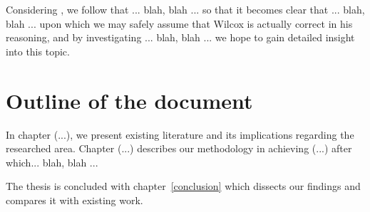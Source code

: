 Considering \cite{wilcox}, we follow that ... blah, blah ... so that it becomes
clear that ... blah, blah ... upon which we may safely assume that Wilcox is
actually correct in his reasoning, and by investigating ... blah, blah ...
we hope to gain detailed insight into this topic.


\section{Outline of the document}
\label{introduction:outline}

In chapter (...), we present existing literature and its implications regarding
the researched area. Chapter (...) describes our methodology in achieving (...)
after which... blah, blah ...

The thesis is concluded with chapter~\ref{conclusion} which dissects our
findings and compares it with existing work.


%
%
